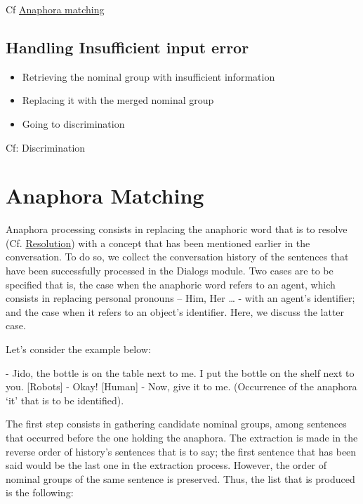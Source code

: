 \documentclass[twoside,a4paper,10pt]{report}
\begin{document}
Cf \hyperref[4873f0687cc3361050cff094f296df2d]{Anaphora matching}


\subsection{Handling Insufficient input error}
\label{a9b6979d4ccc758341445731028f7332}%

\begin{itemize}
    \item  Retrieving the nominal group with insufficient information
    \item  Replacing it with the merged nominal group
    \item  Going to discrimination
\end{itemize}

Cf: Discrimination


\section{Anaphora Matching}
\label{4873f0687cc3361050cff094f296df2d}%

Anaphora processing consists in replacing the anaphoric word that is to resolve (Cf. \hyperref[b7e164b34ff76b1cda93a058604190da]{Resolution}) with a concept that has been mentioned earlier in the conversation. To do so, we collect the conversation history of the sentences that have been successfully processed in the Dialogs module.
Two cases are to be specified that is, the case when the anaphoric word refers to an agent, which consists in replacing personal pronouns – Him, Her … - with an agent’s identifier; and the case when it  refers to an object’s identifier. Here, we discuss the latter case.

Let’s consider the example below:


\small
\begin{verbatimtab}
  [Human]  - Jido, the bottle is on the table next to me. I put the bottle on the shelf next to you.
  [Robots] - Okay!
  [Human]  - Now, give it to me. (Occurrence of the anaphora ‘it’ that is to be identified).
\end{verbatimtab}
\normalsize

The first step consists in gathering candidate nominal groups, among sentences that occurred before the one holding the anaphora. The extraction is made in the reverse order of history’s sentences that is to say; the first sentence that has been said would be the last one in the extraction process. However, the order of nominal groups of the same sentence is preserved. Thus, the list that is produced is the following:
\end{document}
